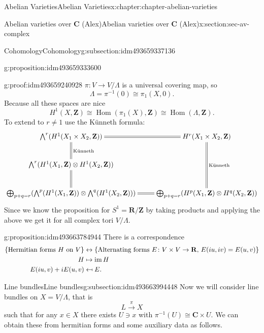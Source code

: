 \documentclass[oneside,10pt,]{book}
\numberwithin{equation}{section}
\providecommand\mapsfrom{\mathrel{\reflectbox{\ensuremath{\mapsto}}}}
\newcommand{\ZZ}{\mathbf{Z}}
\newcommand{\RR}{\mathbf{R}}
\newcommand{\CC}{\mathbf{C}}
\DeclareMathOperator{\Hom}{Hom}
\DeclareMathOperator{\im}{im}
\newcommand{\amp}{&}
\begin{document}
\begin{chapterptx}{Abelian Varieties}{}{Abelian Varieties}{}{}{x:chapter:chapter-abelian-varieties}
\begin{sectionptx}{Abelian varieties over \(\CC\) (Alex)}{}{Abelian varieties over \(\CC\) (Alex)}{}{}{x:section:sec-av-complex}
\begin{subsectionptx}{Cohomology}{}{Cohomology}{}{}{g:subsection:idm493659337136}
\begin{proposition}{}{}{g:proposition:idm493659333600}
%
\end{proposition}
\begin{proofptx}{}{g:proof:idm493659240928}
\(\pi\colon V\to V/\Lambda\) is a universal covering map, so%
\begin{equation*}
\Lambda = \pi^{-1} (0 ) \cong \pi_1(X,0)\text{.}
\end{equation*}
Because all these spaces are nice%
\begin{equation*}
H^1 (X,\ZZ) \cong \Hom(\pi_1(X), \ZZ) \cong \Hom(\Lambda, \ZZ)\text{.}
\end{equation*}
To extend to \(r \ne 1\) use the Künneth formula:%
\begin{equation*}
\xymatrix{
\bigwedge^r(H^1(X_1\times X_2, \ZZ)) \ar@{=}[r]\ar@{=}[d]^{\text{Künneth}} & H^r(X_1\times X_2 , \ZZ)\ar@{=}[dd]^{\text{Künneth}}\\
\bigwedge^r(H^1(X_1, \ZZ)\otimes H^1(X_2, \ZZ)) \ar@{=}[d]& \\
\bigoplus_{p+q=r}(\bigwedge^p(H^1(X_1, \ZZ))\otimes\bigwedge^q(H^1(X_2, \ZZ))) \ar@{=}[r] & \bigoplus_{p+q=r}(H^p(X_1, \ZZ)\otimes H^q(X_2, \ZZ))
}
\end{equation*}
Since we know the proposition for \(S^1 = \RR/\ZZ\) by taking products and applying the above we get it for all complex tori \(V/\Lambda\).%
\end{proofptx}
\begin{proposition}{}{}{g:proposition:idm493663784944}%
There is a correspondence%
\begin{align*}
\{\text{Hermitian forms }H \text{ on } V\} \amp\leftrightarrow\{\text{Alternating forms }E\colon V\times V\to\RR,\,E(iu,iv) = E(u,v)\}\\
H\amp\mapsto \im H\\
E(iu,v)+ i E(u,v) \amp\mapsfrom E\text{.}
\end{align*}
%
\end{proposition}
\end{subsectionptx}
%
%
\typeout{************************************************}
\typeout{************************************************}
%
\begin{subsectionptx}{Line bundles}{}{Line bundles}{}{}{g:subsection:idm493663994448}
Now we will consider line bundles on \(X = V/\Lambda\), that is%
\begin{equation*}
L\xrightarrow{\pi} X
\end{equation*}
such that for any \(x\in X\) there exists \(U\ni x\) with \(\pi^{-1} (U) \cong \CC \times U\). We can obtain these from hermitian forms and some auxiliary data as follows.%

\end{subsectionptx}
\end{sectionptx}
\end{chapterptx}
\end{document}
